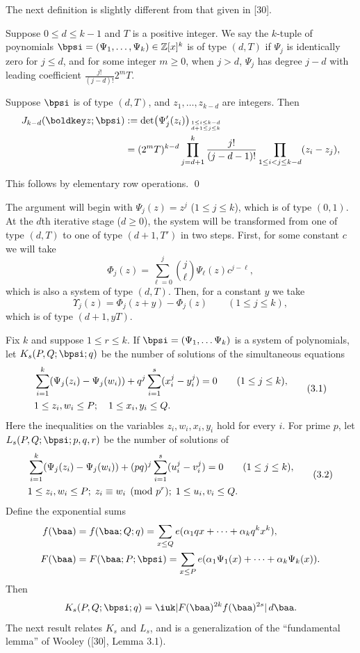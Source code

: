 The next definition is slightly different from that given in [30].

  Suppose $0\le d \le k-1$ and $T$ is a positive integer.
We say the $k$-tuple of poynomials $\bpsi=
(\Psi_1,\ldots,\Psi_k) \in \Bbb Z[x]^k$ 
is of type $(d,T)$ if $\Psi_j$ is identically zero for $j\le d$, and for
some integer $m\ge 0$, when
$j> d$, $\Psi_j$ has degree $j-d$ with leading coefficient
$\frac{j!}{(j-d)!}2^m T$.
\endproclaim

 Suppose $\bpsi$ is of type $(d,T)$, and 
$z_1,\ldots,z_{k-d}$ are integers.  Then
$$
\split
J_{k-d}(\zz;\bpsi) &:=  
\det \bigl( \Psi_j'(z_i) \bigr)_{1\le i\le k-d \atop d+1\le j\le k} \\
 &= (2^m T)^{k-d} \prod_{j=d+1}^k \frac{j!}{(j-d-1)!}
\prod_{1\le i<j \le k-d} (z_i-z_j),
\endsplit
$$
\endproclaim

  This follows by elementary row operations.
\qed\enddemo

The argument will begin with $\Psi_j(z)=z^j$ ($1\le j\le k$), which is of
type $(0,1)$.  At the $d$th iterative stage ($d\ge 0$), 
the system will be transformed
from one of type $(d,T)$ to one of type $(d+1,T')$ in two steps.
First, for some constant $c$ we will take
$$
\Phi_j(z)=\sum_{\ell=0}^j \binom{j}{\ell} \Psi_\ell(z) c^{j-\ell},
$$
which is also  a system of type $(d,T)$.  Then, for a constant $y$ we take
$$
\Upsilon_j(z) = \Phi_j(z+y)-\Phi_j(z) \qquad (1\le j\le k),
$$
which is of type $(d+1,yT)$.

Fix $k$ and suppose $1\le r\le k$.
If $\bpsi=(\Psi_1,\ldots\Psi_k)$ is a system of polynomials, let $K_{s}(P,Q;
\bpsi;q)$ be the number of solutions of the simultaneous equations
$$
\aligned
&\sum_{i=1}^k (\Psi_j(z_i)-\Psi_j(w_i)) + q^j 
\sum_{i=1}^s (x_i^j-y_i^j)=0
\qquad (1\le j\le k), \\
&1 \le z_i,w_i \le P; \quad 1 \le x_i,y_i \le Q.
\endaligned\tag{3.1}
$$
Here the inequalities on the variables $z_i,w_i,x_i,y_i$ hold for every $i$.
For prime $p$, let $L_{s}(P,Q;\bpsi;p,q,r)$
be the number of solutions of
$$
\aligned
&\sum_{i=1}^k
(\Psi_j(z_i)-\Psi_j(w_i)) + (pq)^j \sum_{i=1}^s (u_i^j-v_i^j)=0
\qquad (1\le j\le k), \\
&1 \le z_i,w_i \le  P; \;  z_i \equiv w_i \pmod{p^r}; \;
 1 \le u_i,v_i \le Q.
\endaligned\tag{3.2}
$$
Define the exponential sums
$$
\split
f(\baa)&=f(\baa;Q;q)=\sum_{x\le Q} e(\a_1 q x + \cdots + \a_k q^k x^k), \\
F(\baa)&=F(\baa;P;\bpsi) = \sum_{x\le P} e(\a_1 \Psi_1(x) + \cdots
+\a_k \Psi_k(x)).
\endsplit
$$
Then
$$
K_{s}(P,Q;\bpsi;q) = \iuk |F(\baa)^{2k} f(\baa)^{2s}|
\, d\baa.
$$
The next result relates $K_s$ and $L_s$, and
is a generalization of the ``fundamental lemma'' 
of Wooley ([30], Lemma 3.1).

